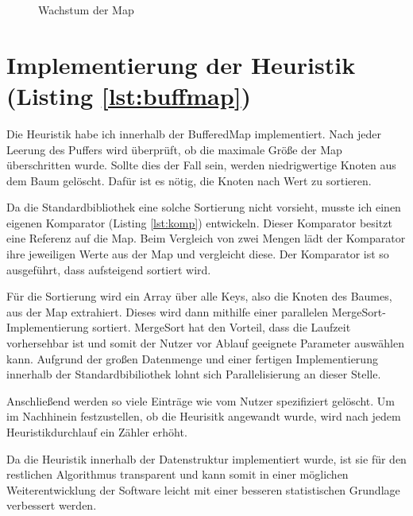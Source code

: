 \begin{figure}[!h]
	\centering
	
	\caption{Wachstum der Map}
	\label{abb:map}
\end{figure}

\section{Implementierung der Heuristik (Listing \ref{lst:buffmap})}
Die Heuristik habe ich innerhalb der BufferedMap implementiert. Nach jeder Leerung des Puffers wird überprüft, ob die maximale Größe der Map überschritten wurde.
Sollte dies der Fall sein, werden niedrigwertige Knoten aus dem Baum gelöscht. Dafür ist es nötig, die Knoten nach Wert zu sortieren.

Da die Standardbibliothek eine solche Sortierung nicht vorsieht, musste ich einen eigenen Komparator (Listing \ref{lst:komp}) entwickeln. Dieser Komparator besitzt eine Referenz auf die Map. Beim Vergleich von zwei Mengen lädt der Komparator ihre jeweiligen Werte aus der Map und vergleicht diese. Der Komparator ist so ausgeführt, dass aufsteigend sortiert wird.

Für die Sortierung wird ein Array über alle Keys, also die Knoten des Baumes, aus der Map extrahiert. Dieses wird dann mithilfe einer parallelen MergeSort-Implementierung sortiert. MergeSort hat den Vorteil, dass die Laufzeit vorhersehbar ist und somit der Nutzer vor Ablauf geeignete Parameter auswählen kann. Aufgrund der großen Datenmenge und einer fertigen Implementierung innerhalb der Standardbibiliothek lohnt sich Parallelisierung an dieser Stelle.

Anschließend werden so viele Einträge wie vom Nutzer spezifiziert gelöscht. Um im Nachhinein festzustellen, ob die Heurisitk angewandt wurde, wird nach jedem Heuristikdurchlauf ein Zähler erhöht.

Da die Heuristik innerhalb der Datenstruktur implementiert wurde, ist sie für den restlichen Algorithmus transparent und kann somit in einer möglichen Weiterentwicklung der Software leicht mit einer besseren statistischen Grundlage verbessert werden.
